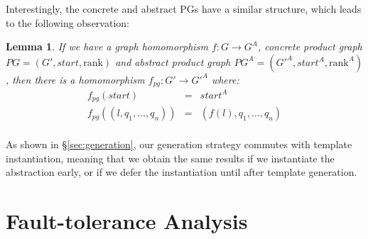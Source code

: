\documentclass[numbers, 10pt]{sigplanconf}
\newcommand{\EG}{\emph{e.g.}}
\newcommand{\IE}{\emph{i.e.}}
\newcommand{\Pref}{\ensuremath{\mathrm{rank}}}
\newtheorem{lem}[thm]{Lemma}
\begin{document}
Interestingly, the concrete and abstract PGs have a similar structure, which leads to the following observation:

\begin{lem}
\label{lem:homomorphism}
If we have a graph homomorphism $f : G \rightarrow G^A$, concrete product graph $PG = (G',\mathit{start},\Pref)$ and abstract product graph $PG^A = (G'^A, \mathit{start}^A, \Pref^A)$, then there is a homomorphism $f_{pg} : G' \rightarrow G'^A$ where:
\[ \begin{array}{rcl}
  f_{pg}( \mathit{start} ) & = & \mathit{start}^A  \\
  f_{pg}( (l,q_1,\ldots,q_n) ) & = & (f(l),q_1,\ldots,q_n) \\
\end{array} \]
\end{lem}
%
As shown in \S\ref{sec:generation}, our generation strategy commutes with template instantiation, meaning that we obtain the same results if we instantiate the abstraction early, or if we defer the instantiation until after template generation.
%



%
%
%
%


\section{Fault-tolerance Analysis}
\label{sec:analysis}

\end{document}

